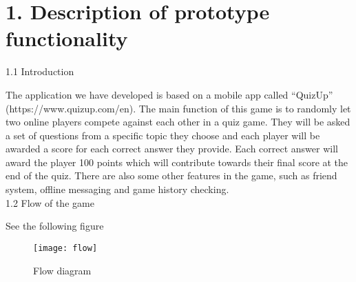 \documentclass{article}
\begin{document}


\section{1. Description of prototype functionality}

1.1	Introduction

The application we have developed is based on a mobile app called “QuizUp” (https://www.quizup.com/en). The main function of this game is to randomly let two online players compete against each other in a quiz game. They will be asked a set of questions from a specific topic they choose and each player will be awarded a score for each correct answer they provide. Each correct answer will award the player 100 points which will contribute towards their final score at the end of the quiz. There are also some other features in the game, such as friend system, offline messaging and game history checking. \\

1.2	Flow of the game 

See the following figure
\begin{figure}[h]
    \centering
    \texttt{[image: flow]}
    \caption{Flow diagram}
\end{figure}
\end{document}
